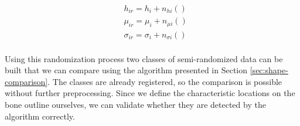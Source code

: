 \documentclass[pdftex,12pt,a4paper]{report}
\begin{document}
\begin{equation}
	\begin{split}
		& h_{ir} = h_i + n_{hi}() \\
		& \mu_{ir} = \mu_i + n_{\mu i}() \\
		& \sigma_{ir} = \sigma_i + n_{\sigma i}() \\
	\end{split}
\end{equation}

Using this randomization process two classes of semi-randomized data can be built that we can compare using the algorithm presented in Section \ref{sec:shape-comparison}. The classes are already registered, so the comparison is possible without further preprocessing. Since we define the characteristic locations on the bone outline ourselves, we can validate whether they are detected by the algorithm correctly.
\end{document}
